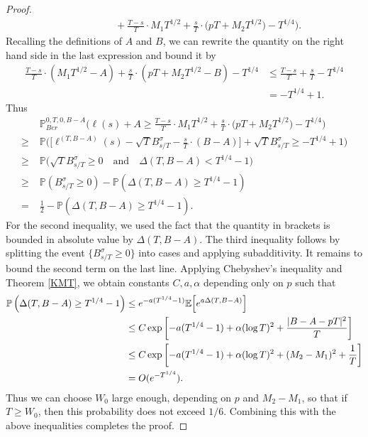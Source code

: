 \begin{proof}
\begin{align*}
	&\qquad\qquad + \frac{T-s}{T} \cdot M_1 T^{1/2} + \frac{s}{T} \cdot \big(p T + M_2 T^{1/2}\big) - T^{1/4} \Big).
	\end{align*}
	Recalling the definitions of $A$ and $B$, we can rewrite the quantity on the right hand side in the last expression and bound it by
	\begin{align*}
	\frac{T-s}{T}\cdot(M_1T^{1/2}-A) + \frac{s}{T}\cdot(pT + M_2T^{1/2} - B) - T^{1/4} &\leq  \frac{T-s}{T} + \frac{s}{T} - T^{1/4}\\
	& = -T^{1/4} + 1.
	\end{align*}
	Thus
	\begin{align*}
	&\mathbb{P}^{0,T,0,B-A}_{Ber}\Big( \ell(s) + A  \geq \frac{T-s}{T} \cdot M_1 T^{1/2} + \frac{s}{T} \cdot \big(p T + M_2 T^{1/2}\big) - T^{1/4} \Big)\\
	\geq \; & \mathbb{P}\Big( \Big[\ell^{(T,B-A)}(s) - \sqrt{T} B^\sigma_{s/T} - \frac{s}{T}\cdot(B-A)\Big] + \sqrt{T}B^\sigma_{s/T} \geq -T^{1/4} + 1 \Big)\\
	\geq \; & \mathbb{P}\Big( \sqrt{T}B^\sigma_{s/T} \geq 0 \quad \mathrm{and} \quad \Delta(T,B-A) < T^{1/4} - 1 \Big)\\
	\geq \; & \mathbb{P}\left( B^\sigma_{s/T} \geq 0 \right) - \mathbb{P}\left( \Delta(T,B-A) \geq T^{1/4} - 1 \right)\\
	= \; & \frac{1}{2} - \mathbb{P}\left( \Delta(T,B-A) \geq T^{1/4} - 1 \right).
	\end{align*}
	For the second inequality, we used the fact that the quantity in brackets is bounded in absolute value by $\Delta(T,B-A)$. The third inequality follows by splitting the event $\{B^\sigma_{s/T}\geq 0\}$ into cases and applying subadditivity. It remains to bound the second term on the last line. Applying Chebyshev's inequality and Theorem \ref{KMT}, we obtain constants $C,a,\alpha$ depending only on $p$ such that
	\begin{align*}
	\mathbb{P}\left( \Delta(T,B-A) \geq T^{1/4} - 1 \right) & \leq e^{-a(T^{1/4} - 1)} \mathbb{E}\Big[ e^{a\Delta(T,B-A)} \Big]\\
	&\leq C \exp\left[ -a(T^{1/4}-1) + \alpha(\log T)^2 + \frac{|B-A-pT|^2}{T} \right]\\
	&\leq C \exp\left[ -a(T^{1/4}-1) + \alpha(\log T)^2 + (M_2-M_1)^2 + \frac{1}{T} \right]\\
	&= O(e^{-T^{1/4}}).
	\end{align*}
	Thus we can choose $W_0$ large enough, depending on $p$ and $M_2-M_1$, so that if $T \geq W_0$, then this probability does not exceed $1/6$. Combining this with the above inequalities completes the proof.
\end{proof}

